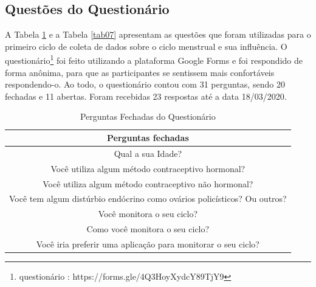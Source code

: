 \subsection{Questões do Questionário}

A Tabela \ref{tab06} e a Tabela \ref{tab07} apresentam as questões que foram utilizadas para o primeiro ciclo de coleta de dados sobre o ciclo menstrual e 
sua influência. O questionário\footnote{questionário : https://forms.gle/4Q3HoyXydcY89TjY9} foi feito utilizando a plataforma Google Forms e foi respondido de forma anônima, para que as
participantes se sentissem mais confortáveis respondendo-o. Ao todo, o questionário contou com 31 perguntas, sendo 20 fechadas e 
11 abertas. Foram recebidas 23 respostas até a data 18/03/2020.

\begin{table}[ht]
	\centering
	\caption{Perguntas Fechadas do Questionário}
	\label{tab06}
	\begin{tabular}{c}
		\toprule
		\textbf{Perguntas fechadas} \\
        \midrule
        \begin{minipage} [t] {1\textwidth} Qual a sua Idade?  \end{minipage} \\
        \midrule
        \begin{minipage} [t] {1\textwidth} Você utiliza algum método contraceptivo hormonal?   \end{minipage}\\
        \midrule
        \begin{minipage} [t] {1\textwidth} Você utiliza algum método contraceptivo não hormonal?  \end{minipage} \\
        \midrule
        \begin{minipage} [t] {1\textwidth}  Você tem algum distúrbio endócrino como ovários policísticos? Ou outros? \end{minipage}  \\
        \midrule
        \begin{minipage} [t] {1\textwidth}  Você monitora o seu ciclo? \end{minipage}\\
        \midrule
        \begin{minipage} [t] {1\textwidth}  Como você monitora o seu ciclo? \end{minipage} \\
        \midrule
        \begin{minipage} [t] {1\textwidth}  Você iria preferir uma aplicação para monitorar o seu ciclo?\end{minipage}\\

\end{tabular}
\end{table}
